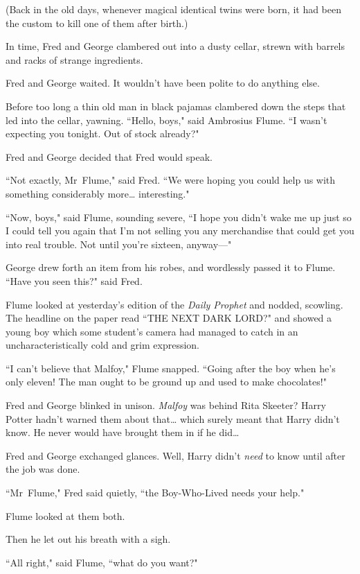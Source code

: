 (Back in the old days, whenever magical identical twins were born, it had been the custom to kill one of them after birth.)

In time, Fred and George clambered out into a dusty cellar, strewn with barrels and racks of strange ingredients.

Fred and George waited. It wouldn't have been polite to do anything else.

Before too long a thin old man in black pajamas clambered down the steps that led into the cellar, yawning. ``Hello, boys," said Ambrosius Flume. ``I wasn't expecting you tonight. Out of stock already?"

Fred and George decided that Fred would speak.

``Not exactly, Mr~Flume," said Fred. ``We were hoping you could help us with something considerably more{\ldots} interesting."

``Now, boys," said Flume, sounding severe, ``I hope you didn't wake me up just so I could tell you again that I'm not selling you any merchandise that could get you into real trouble. Not until you're sixteen, anyway—"

George drew forth an item from his robes, and wordlessly passed it to Flume. ``Have you seen this?" said Fred.

Flume looked at yesterday's edition of the \emph{Daily Prophet} and nodded, scowling. The headline on the paper read ``THE NEXT DARK LORD?" and showed a young boy which some student's camera had managed to catch in an uncharacteristically cold and grim expression.

``I can't believe that Malfoy," Flume snapped. ``Going after the boy when he's only eleven! The man ought to be ground up and used to make chocolates!"

Fred and George blinked in unison. \emph{Malfoy} was behind Rita Skeeter? Harry Potter hadn't warned them about that{\ldots} which surely meant that Harry didn't know. He never would have brought them in if he did{\ldots}

Fred and George exchanged glances. Well, Harry didn't \emph{need} to know until after the job was done.

``Mr~Flume," Fred said quietly, ``the Boy-Who-Lived needs your help."

Flume looked at them both.

Then he let out his breath with a sigh.

``All right," said Flume, ``what do you want?"

